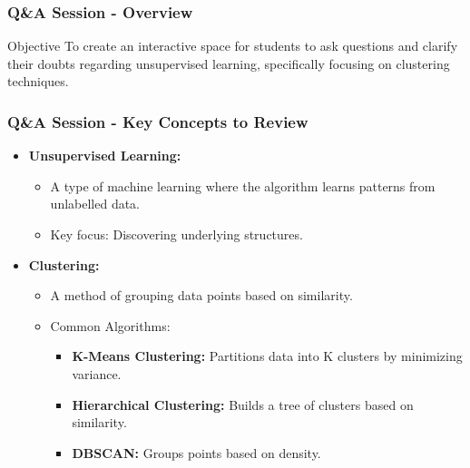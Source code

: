 \documentclass[aspectratio=169]{beamer}
\begin{document}
\begin{frame}[fragile]
  \frametitle{Q\&A Session - Overview}
  
  \begin{block}{Objective}
    To create an interactive space for students to ask questions and clarify their doubts regarding unsupervised learning, specifically focusing on clustering techniques.
  \end{block}
  
\end{frame}

\begin{frame}[fragile]
  \frametitle{Q\&A Session - Key Concepts to Review}
  
  \begin{itemize}
    \item \textbf{Unsupervised Learning:}
      \begin{itemize}
        \item A type of machine learning where the algorithm learns patterns from unlabelled data.
        \item Key focus: Discovering underlying structures.
      \end{itemize}
    
    \item \textbf{Clustering:}
      \begin{itemize}
        \item A method of grouping data points based on similarity.
        \item Common Algorithms:
          \begin{itemize}
            \item \textbf{K-Means Clustering:} Partitions data into K clusters by minimizing variance.
            \item \textbf{Hierarchical Clustering:} Builds a tree of clusters based on similarity.
            \item \textbf{DBSCAN:} Groups points based on density.
          \end{itemize}
      \end{itemize}
  \end{itemize}

\end{frame}
\end{document}
